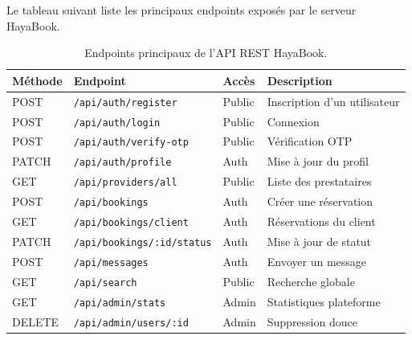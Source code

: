 Le tableau suivant liste les principaux endpoints exposés par le serveur HayaBook.

\begin{table}[h]
\centering
\caption{Endpoints principaux de l'API REST HayaBook.}
\label{tab:endpoints}
\begin{tabular}{|l|l|l|l|}
\hline
\textbf{Méthode} & \textbf{Endpoint} & \textbf{Accès} & \textbf{Description} \\
\hline
POST & \texttt{/api/auth/register} & Public & Inscription d'un utilisateur \\
\hline
POST & \texttt{/api/auth/login} & Public & Connexion \\
\hline
POST & \texttt{/api/auth/verify-otp} & Public & Vérification OTP \\
\hline
PATCH & \texttt{/api/auth/profile} & Auth & Mise à jour du profil \\
\hline
GET & \texttt{/api/providers/all} & Public & Liste des prestataires \\
\hline
POST & \texttt{/api/bookings} & Auth & Créer une réservation \\
\hline
GET & \texttt{/api/bookings/client} & Auth & Réservations du client \\
\hline
PATCH & \texttt{/api/bookings/:id/status} & Auth & Mise à jour de statut \\
\hline
POST & \texttt{/api/messages} & Auth & Envoyer un message \\
\hline
GET & \texttt{/api/search} & Public & Recherche globale \\
\hline
GET & \texttt{/api/admin/stats} & Admin & Statistiques plateforme \\
\hline
DELETE & \texttt{/api/admin/users/:id} & Admin & Suppression douce \\
\hline
\end{tabular}
\end{table}